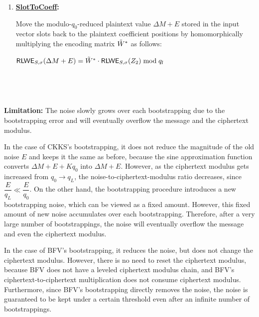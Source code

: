 \begin{tcolorbox}[title={\textbf{\tboxlabel{\ref*{subsubsec:ckks-bootstrapping-summary}} CKKS Bootstrapping}}]
\begin{enumerate}
$ $

This step is equivalent to \textit{homomorphically} performing modulo reduction by $q_0$ to the input value. This step reduces the ciphertext modulus from $q_L \rightarrow q_l$ as it consumes multiplicative levels when homomorphically evaluating the polynomial approximation of the sine function.

$ $

\item \textsf{\textbf{\underline{SlotToCoeff}:}} 

Move the modulo-$q_0$-reduced plaintext value $\Delta M + E$ stored in the input vector slots back to the plaintext coefficient positions by homomorphically multiplying the encoding matrix $\tilde W^*$ as follows:

$\textsf{RLWE}_{S, \sigma}(\Delta M + E) = \tilde W^* \cdot \textsf{RLWE}_{S, \sigma}(Z_2)  \bmod q_l$

$ $

\end{enumerate}

$ $

\textbf{Limitation:} The noise slowly grows over each bootstrapping due to the bootstrapping error and will eventually overflow the message and the ciphertext modulus. 

\end{tcolorbox}


 In the case of CKKS's bootstrapping, it does not reduce the magnitude of the old noise $E$ and keeps it the same as before, because the sine approximation function converts $\Delta M + E + Kq_0$ into $\Delta M + E$. However, as the ciphertext modulus gets increased from $q_0 \rightarrow q_L$, the noise-to-ciphertext-modulus ratio decreases, since $\dfrac{E}{q_L} \ll \dfrac{E}{q_0}$. On the other hand, the bootstrapping procedure introduces a new bootstrapping noise, which can be viewed as a fixed amount. However, this fixed amount of new noise accumulates over each bootstrapping. Therefore, after a very large number of bootstrappings, the noise will eventually overflow the message and even the ciphertext modulus. 

In the case of BFV's bootstrapping, it reduces the noise, but does not change the ciphertext modulus. However, there is no need to reset the ciphertext modulus, because BFV does not have a leveled ciphertext modulus chain, and BFV's ciphertext-to-ciphertext multiplication does not consume ciphertext modulus. Furthermore, since BFV's bootstrapping directly removes the noise, the noise is guaranteed to be kept under a certain threshold even after an infinite number of bootstrappings. 

